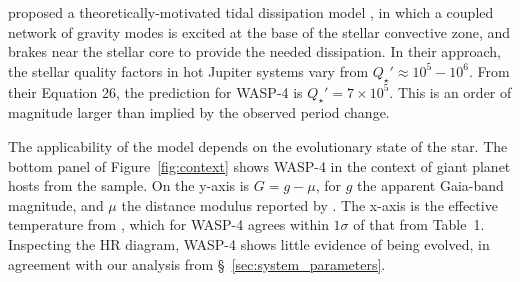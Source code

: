 \documentclass[12pt,twocolumn,tighten]{aastex62}
\begin{document}

\citet{essick_orbital_2016} proposed a theoretically-motivated tidal
dissipation model , in which a coupled network of gravity modes is
excited at the base of the stellar convective zone, and brakes near
the stellar core to provide the needed dissipation.  In their
approach, the stellar quality factors in hot Jupiter systems vary from
$Q_\star' \approx 10^5 - 10^6$.  From their Equation 26, the
prediction for WASP-4 is $Q_\star' = 7\times10^5$.  This is an order
of magnitude larger than implied by the observed period change.

The applicability of the \citet{essick_orbital_2016} model depends on
the evolutionary state of the star.  The bottom panel of
Figure~\ref{fig:context} shows WASP-4 in the context of giant planet
hosts from the \citet{bonomo_gaps_2017} sample.  On the y-axis is
$G=g-\mu$, for $g$ the apparent Gaia-band magnitude, and $\mu$ the
distance modulus reported by \citet{gaia_collaboration_gaia_2018}.
The x-axis is the effective temperature from \citet{bonomo_gaps_2017},
which for WASP-4 agrees within $1\sigma$ of that from Table~1.
Inspecting the HR diagram, WASP-4 shows little evidence of being
evolved, in agreement with our analysis from
\S~\ref{sec:system_parameters}.
\end{document}
